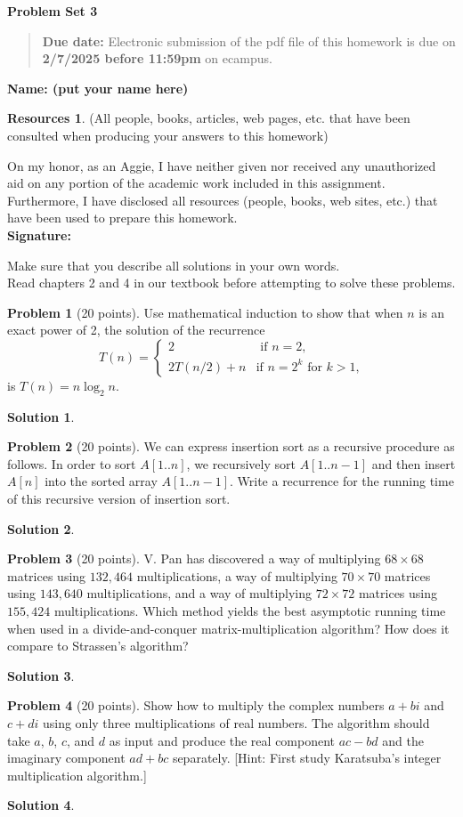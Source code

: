\documentclass{article}
\theoremstyle{definition}
\newtheorem{problem}{Problem}
\newtheorem*{solution}{Solution}
\newtheorem*{resources}{Resources}
\newcommand{\name}[1]{\noindent\textbf{Name: #1}}
\newcommand{\honor}{\noindent On my honor, as an Aggie, I have neither
  given nor received any unauthorized aid on any portion of the
  academic work included in this assignment. Furthermore, I have
  disclosed all resources (people, books, web sites, etc.) that have
  been used to prepare this homework. \\[1ex]
 \textbf{Signature:} \underline{\hspace*{5cm}} }
\newcommand{\problemset}[1]{\begin{center}\textbf{Problem Set
      #1}\end{center}}
\newcommand{\duedate}[1]{\begin{quote}\textbf{Due date:} Electronic
    submission of the pdf file of this homework is due on
    \textbf{#1} on ecampus. \end{quote} }
\begin{document}
\problemset{3}
\duedate{2/7/2025 before 11:59pm}
\name{ (put your name here)}
\begin{resources} (All people, books, articles, web pages, etc. that
  have been consulted when producing your answers to this homework)
\end{resources}
\honor

\newpage
\noindent Make sure that you describe all solutions in your own words. \\[1ex]
Read chapters 2 and 4 in our textbook before attempting to solve these
problems. 

\medskip

\begin{problem}[20 points]
  Use mathematical induction to show that when $n$ is an exact power of 2, the solution of the recurrence
$$ T(n) = \begin{cases}
2 & \text{ if $n=2$,} \\
2T(n/2) + n & \text{if $n=2^k$ for $k>1$,}
\end{cases}
$$
is $T(n)=n\log_2 n$. 
\end{problem}
\begin{solution}
\end{solution}

\begin{problem}[20 points]
  We can express insertion sort as a recursive procedure as follows. 
In order to sort $A[1..n]$, we recursively sort $A[1..n-1]$ and then
insert $A[n]$ into the sorted array $A[1..n-1]$. Write a recurrence for
the running time of this recursive version of insertion sort. 
\end{problem}
\begin{solution}
\end{solution}

\begin{problem}[20 points]
  V. Pan has discovered a way of multiplying $68 \times 68$ matrices
  using $132,464$ multiplications, a way of multiplying $70\times 70$
  matrices using $143,640$ multiplications, and a way of multiplying
  $72\times 72$ matrices using $155,424$ multiplications. Which method
  yields the best asymptotic running time when used in a
  divide-and-conquer matrix-multiplication algorithm? How does it
  compare to Strassen’s algorithm?
\end{problem}
\begin{solution}
\end{solution}

\begin{problem}[20 points]
  Show how to multiply the complex numbers $a+bi$ and $c+di$ using
  only three multiplications of real numbers. The algorithm should
  take $a$, $b$, $c$, and $d$ as input and produce the real component
  $ac-bd$ and the imaginary component $ad+bc$ separately. [Hint: First
  study Karatsuba's integer multiplication algorithm.]
\end{problem}
\begin{solution}
\end{solution}
\end{document}

